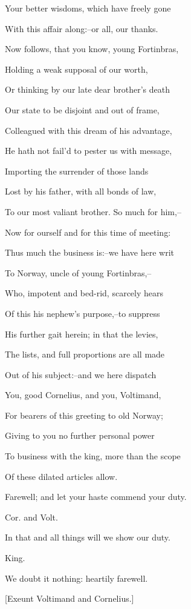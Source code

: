 \documentclass[12pt]{book}
\begin{document}
Your better wisdoms, which have freely gone

With this affair along:--or all, our thanks.

Now follows, that you know, young Fortinbras,

Holding a weak supposal of our worth,

Or thinking by our late dear brother's death

Our state to be disjoint and out of frame,

Colleagued with this dream of his advantage,

He hath not fail'd to pester us with message,

Importing the surrender of those lands

Lost by his father, with all bonds of law,

To our most valiant brother. So much for him,--

Now for ourself and for this time of meeting:

Thus much the business is:--we have here writ

To Norway, uncle of young Fortinbras,--

Who, impotent and bed-rid, scarcely hears

Of this his nephew's purpose,--to suppress

His further gait herein; in that the levies,

The lists, and full proportions are all made

Out of his subject:--and we here dispatch

You, good Cornelius, and you, Voltimand,

For bearers of this greeting to old Norway;

Giving to you no further personal power

To business with the king, more than the scope

Of these dilated articles allow.

Farewell; and let your haste commend your duty.



Cor. and Volt.

In that and all things will we show our duty.



King.

We doubt it nothing: heartily farewell.



[Exeunt Voltimand and Cornelius.]
\end{document}
